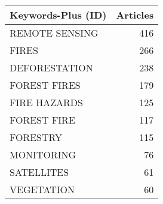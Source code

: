
\begin{tabular}{lr}
\toprule
Keywords-Plus (ID) & Articles\\
\midrule
REMOTE SENSING & 416\\
FIRES & 266\\
DEFORESTATION & 238\\
FOREST FIRES & 179\\
FIRE HAZARDS & 125\\
\addlinespace
FOREST FIRE & 117\\
FORESTRY & 115\\
MONITORING & 76\\
SATELLITES & 61\\
VEGETATION & 60\\
\bottomrule
\end{tabular}